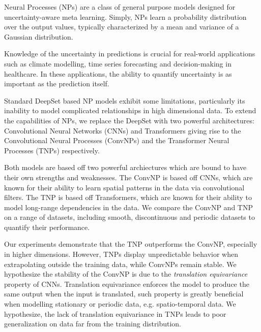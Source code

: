 \documentclass[../../main.tex]{subfiles}
\begin{document}

Neural Processes (NPs) are a class of general purpose models designed for uncertainty-aware meta learning. Simply, NPs learn a probability distribution over the output values, typically characterized by a mean and variance of a Gaussian distribution.

Knowledge of the uncertainty in predictions is crucial for real-world applications such as climate modelling, time series forecasting and decision-making in healthcare. In these applications, the ability to quantify uncertainty is as important as the prediction itself. 

Standard DeepSet based NP models exhibit some limitations, particularly its inability to model complicated relationships in high dimensional data. To extend the capabilities of NPs, we replace the DeepSet with two powerful architectures: Convolutional Neural Networks (CNNs) and Transformers giving rise to the Convolutional Neural Processes (ConvNPs) and the Transformer Neural Processes (TNPs) respectively. 

Both models are based off two powerful archiectures which are bound to have their own strengths and weaknesses. The ConvNP is based off CNNs, which are known for their ability to learn spatial patterns in the data via convolutional filters. The TNP is based off Transformers, which are known for their ability to model long-range dependencies in the data. We compare the ConvNP and TNP on a range of datasets, including smooth, discontinuous and periodic datasets to quantify their performance.

Our experiments demonstrate that the TNP outperforms the ConvNP, especially in higher dimensions. However, TNPs display unpredictable behavior when extrapolating outside the training data, while ConvNPs remain stable. We hypothesize the stability of the ConvNP is due to the \emph{translation equivariance} property of CNNs. Translation equivariance enforces the model to produce the same output when the input is translated, such property is greatly beneficial when modelling stationary or periodic data, e.g. spatio-temporal data.
We hypothesize, the lack of translation equivariance in TNPs leads to poor generalization on data far from the training distribution.
\end{document}

